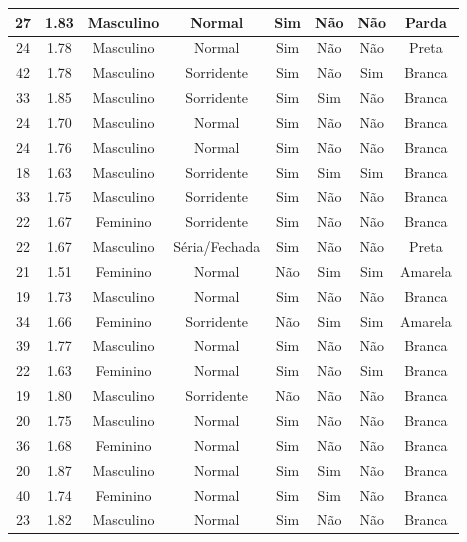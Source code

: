 \begin{table}[!ht]
\begin{tabular}{c | c | c | c | c | c | c | c}
        27 & 1.83 & Masculino & Normal & Sim & Não & Não & Parda \\ \hline
        24 & 1.78 & Masculino & Normal & Sim & Não & Não & Preta \\ \hline
        42 & 1.78 & Masculino & Sorridente & Sim & Não & Sim & Branca \\ \hline
        33 & 1.85 & Masculino & Sorridente & Sim & Sim & Não & Branca \\ \hline
        24 & 1.70 & Masculino & Normal & Sim & Não & Não & Branca \\ \hline
        24 & 1.76 & Masculino & Normal & Sim & Não & Não & Branca \\ \hline
        18 & 1.63 & Masculino & Sorridente & Sim & Sim & Sim & Branca \\ \hline
        33 & 1.75 & Masculino & Sorridente & Sim & Não & Não & Branca \\ \hline
        22 & 1.67 & Feminino & Sorridente & Sim & Não & Não & Branca \\ \hline
        22 & 1.67 & Masculino & Séria/Fechada & Sim & Não & Não & Preta \\ \hline
        21 & 1.51 & Feminino & Normal & Não & Sim & Sim & Amarela \\ \hline
        19 & 1.73 & Masculino & Normal & Sim & Não & Não & Branca \\ \hline
        34 & 1.66 & Feminino & Sorridente & Não & Sim & Sim & Amarela \\ \hline
        39 & 1.77 & Masculino & Normal & Sim & Não & Não & Branca \\ \hline
        22 & 1.63 & Feminino & Normal & Sim & Não & Sim & Branca \\ \hline
        19 & 1.80 & Masculino & Sorridente & Não & Não & Não & Branca \\ \hline
        20 & 1.75 & Masculino & Normal & Sim & Não & Não & Branca \\ \hline
        36 & 1.68 & Feminino & Normal & Sim & Não & Não & Branca \\ \hline
        20 & 1.87 & Masculino & Normal & Sim & Sim & Não & Branca \\ \hline
        40 & 1.74 & Feminino & Normal & Sim & Sim & Não & Branca \\ \hline
        23 & 1.82 & Masculino & Normal & Sim & Não & Não & Branca \\ \hline
	\end{tabular}
\end{table}

